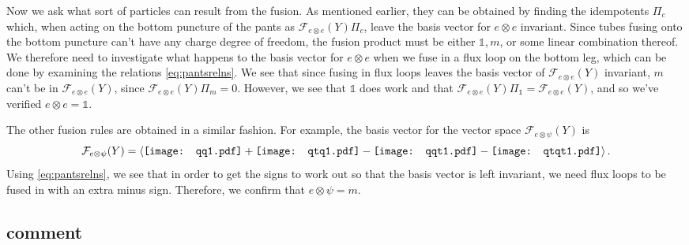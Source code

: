 \documentclass[12pt,a4paper]{article}
\newcommand{\tp}{\otimes}
\newcommand{\unit}{\mathds{1}}
\newcommand\be            {\begin{equation}}
\newcommand\ee            {\end{equation}}
\newcommand{\fld}{\mathcal{F}} %
\newcommand{\qqo}{\mathord{\vcenter{\hbox{\texttt{[image: qq1.pdf]}}}}}
\newcommand{\qtqo}{\mathord{\vcenter{\hbox{\texttt{[image: qtq1.pdf]}}}}}
\newcommand{\qqto}{\mathord{\vcenter{\hbox{\texttt{[image: qqt1.pdf]}}}}}
\newcommand{\qtqto}{\mathord{\vcenter{\hbox{\texttt{[image: qtqt1.pdf]}}}}}
\begin{document}
Now we ask what sort of particles can result from the fusion. As mentioned earlier, they can be obtained by finding the idempotents $\Pi_c$ which, when acting on the bottom puncture of the pants as $\fld_{e\tp e}(Y) \Pi_c$, leave the basis vector for $e\tp e$ invariant. Since tubes fusing onto the bottom puncture can't have any charge degree of freedom, the fusion product must be either $\unit,m$, or some linear combination thereof. We therefore need to investigate what happens to the basis vector for $e\tp e$ when we fuse in a flux loop on the bottom leg, which can be done by examining the relations \eqref{eq:pantsrelns}. We see that since fusing in flux loops leaves the basis vector of $\fld_{e\tp e}(Y)$ invariant, $m$ can't be in $\fld_{e\tp e}(Y)$, since $\fld_{e\tp e}(Y) \Pi_m = 0$. However, we see that $\unit$ does work and that $\fld_{e\tp e}(Y) \Pi_\unit = \fld_{e\tp e}(Y)$, and so we've verified $e\tp e = \unit$. 

The other fusion rules are obtained in a similar fashion. For example, the basis vector for the vector space $\fld_{e\tp \psi}(Y)$ is 
\be \fld_{e\tp \psi}(Y) = \left\langle \qqo + \qtqo - \qqto - \qtqto\right\rangle. \ee
Using \eqref{eq:pantsrelns}, we see that in order to get the signs to work out so that the basis vector is left invariant, we need flux loops to be fused in with an extra minus sign. Therefore, we confirm that $e\tp \psi = m$. 
 
 


 
\subsection{comment}
 
\end{document}
